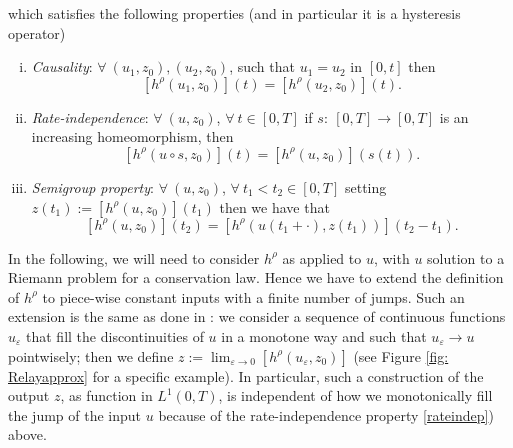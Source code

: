 \documentclass[12pt]{article}
\newcommand{\p}{\rho}
\newcommand{\1}{\mathds{1}}
\theoremstyle{definition}
\begin{document}
\noindent
which satisfies the following properties (and in particular it is a hysteresis operator)
\begin{enumerate}[i)]
    \item \textit{Causality}: $\forall~(u_1,z_0), (u_2,z_0)$, such that $u_1=u_2$ in $[0,t]$ then 
    \[[h^\p(u_1,z_0)](t)=[h^\p(u_2,z_0)](t).\]
    \item \label{rateindep}\textit{Rate-independence}: $\forall~(u,z_0)$, $\forall ~t\in [0,T]$ if $s:~ [0,T]\to [0,T]$ is an increasing homeomorphism, then \begin{equation}\label{eq: rateindependence}[h^\p(u\circ s, z_0)](t)=[h^\p(u,z_0)](s(t)).\end{equation}
    \item \textit{Semigroup property}: $\forall~(u,z_0)$, $\forall ~t_1<t_2\in [0,T]$ setting $z(t_1):=[h^\p(u,z_0)](t_1)$ then we have that \begin{equation}\label{eq: semigroup}
    [h^\p(u,z_0)](t_2)=[h^\p(u(t_1+\cdot),z(t_1))](t_2-t_1).\end{equation}
\end{enumerate}

In the following, we will need to consider $h^\p$ as applied to $u$, with $u$ solution to a Riemann problem for a conservation law. Hence we have to extend the definition of $h^\p$ to piece-wise constant inputs with a finite number of jumps. Such an extension is the same as done in \cite{BFMS}: we consider a sequence of continuous functions $u_\varepsilon$ that fill the discontinuities of $u$ in a monotone way and such that $u_\varepsilon \to u$ pointwisely; then we define $z:=\lim_{\varepsilon \to 0} [h^\p(u_\varepsilon,z_0)]$ (see Figure \ref{fig: Relayapprox} for a specific example). In particular, such a construction of the output $z$, as function in $L^1(0,T)$, is independent of how we monotonically fill the jump of the input $u$ because of the rate-independence property \ref{rateindep}) above. 
\par
\end{document}
